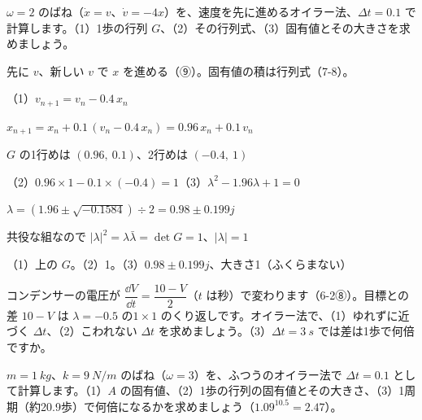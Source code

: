 \begin{reidai}
$\omega=2$ のばね（$\dot x=v$、$\dot v=-4x$）を、速度を先に進めるオイラー法、$\Delta t=0.1$ で計算します。（1）1歩の行列 $G$、（2）その行列式、（3）固有値とその大きさを求めましょう。\par
\kangaekata 先に $v$、新しい $v$ で $x$ を進める（⑨）。固有値の積は行列式（7-8）。\par
\shiki（1）$v_{n+1}=v_n-0.4\,x_n$\par
\kviikq $x_{n+1}=x_n+0.1\,(v_n-0.4\,x_n)=0.96\,x_n+0.1\,v_n$\par
\kviikq $G$ の1行めは $(0.96,\ 0.1)$、2行めは $(-0.4,\ 1)$\par
\kviikq（2）$0.96\times1-0.1\times(-0.4)=1$\qquad（3）$\lambda^2-1.96\lambda+1=0$\par
\kviikq $\lambda=(1.96\pm\sqrt{-0.1584})\div2=0.98\pm0.199j$\par
\kviikq 共役な組なので $|\lambda|^2=\lambda\bar\lambda=\det G=1$、$|\lambda|=1$\par
\kotae（1）上の $G$。（2）1。（3）$0.98\pm0.199j$、大きさ1（ふくらまない）
\end{reidai}

\begingroup{}%
\noindent\begin{minipage}[t]{0.49\linewidth}
\begin{jibun}
\raggedright コンデンサーの電圧が $\dfrac{\dd V}{\dd t}=\dfrac{10-V}{2}$（$t$ は秒）で変わります（6-2⑧）。目標との差 $10-V$ は $\lambda=-0.5$ の$1\times1$ のくり返しです。オイラー法で、（1）ゆれずに近づく $\Delta t$、（2）こわれない $\Delta t$ を求めましょう。（3）$\Delta t=\qty{3}{s}$ では差は1歩で何倍ですか。
\end{jibun}
\end{minipage}\hfill
\begin{minipage}[t]{0.49\linewidth}
\begin{jibun}
\raggedright $m=\qty{1}{kg}$、$k=\qty{9}{N/m}$ のばね（$\omega=3$）を、ふつうのオイラー法で $\Delta t=0.1$ として計算します。（1）$A$ の固有値、（2）1歩の行列の固有値とその大きさ、（3）1周期（約20.9歩）で何倍になるかを求めましょう（$1.09^{10.5}=2.47$）。
\end{jibun}
\end{minipage}\par
\endgroup

